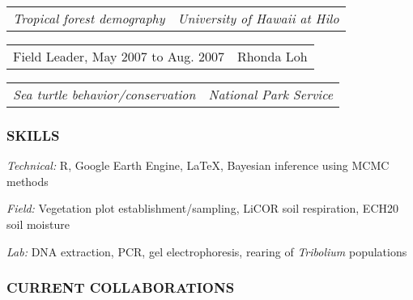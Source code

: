 \documentclass[11pt,english]{article}
\providecommand{\tabularnewline}{\\}
\begin{document}
\begin{tabular}{>{\raggedright}p{3.25in}>{\raggedleft}p{2.75in}}
\hspace{1.5em}\emph{Tropical forest demography} & \emph{University of Hawaii at Hilo}\tabularnewline
\end{tabular}
\vspace{-2ex}

\begin{tabular}{>{\raggedright}p{3in}>{\raggedleft}p{3in}}
Field Leader, May 2007 to Aug. 2007 & Rhonda Loh\tabularnewline
\end{tabular}

\begin{tabular}{>{\raggedright}p{3in}>{\raggedleft}p{3in}}
\hspace{1.5em}\emph{Sea turtle behavior/conservation} & \emph{National Park Service}
\end{tabular}


\vspace{1.5ex}
\subsubsection*{SKILLS}
\vspace{-0.5ex}

\begin{hangparas}{0.25in}{1}
\hspace{0.575em}\emph{Technical:} R, Google Earth Engine, \LaTeX{}, Bayesian inference using MCMC methods

\hspace{0.575em}\emph{Field:} Vegetation plot establishment/sampling, LiCOR soil respiration, ECH20 soil moisture 

\hspace{0.575em}\emph{Lab:} DNA extraction, PCR, gel electrophoresis, rearing of \emph{Tribolium} populations

\end{hangparas}
\vspace{1ex}



\subsubsection*{CURRENT COLLABORATIONS}
\vspace{-0.5ex}
\end{document}
